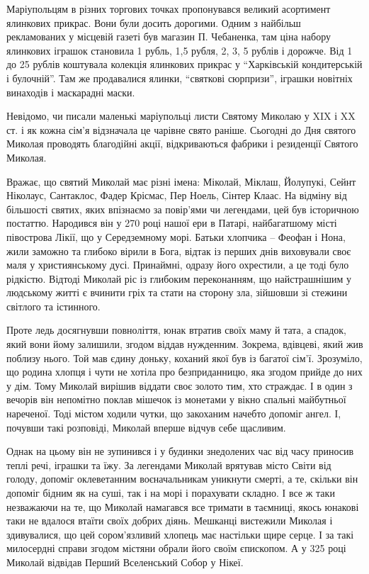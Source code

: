 Маріупольцям в різних торгових точках пропонувався великий асортимент ялинкових
прикрас. Вони були досить дорогими. Одним з найбільш рекламованих у місцевій
газеті був магазин П. Чебаненка, там ціна набору ялинкових іграшок становила 1
рубль, 1,5 рубля, 2, 3, 5 рублів і дорожче. Від 1 до 25 рублів коштувала
колекція ялинкових прикрас у \enquote{Харківській кондитерській і булочній}. Там же
продавалися ялинки, \enquote{святкові сюрпризи}, іграшки новітніх винаходів і
маскарадні маски.

Невідомо, чи писали маленькі маріупольці листи Святому Миколаю у XIX і XX ст. і
як кожна сім’я відзначала це чарівне свято раніше. Сьогодні до Дня святого
Миколая проводять благодійні акції, відкриваються фабрики і резиденції Святого
Миколая.

Вражає, що святий Миколай має різні імена: Міколай, Міклаш, Йолупукі, Сейнт
Ніколаус, Сантаклос, Фадер Крісмас, Пер Ноель, Сінтер Клаас. На відміну від
більшості святих, яких впізнаємо за повір’ями чи легендами, цей був історичною
постаттю. Народився він у 270 році нашої ери в Патарі, найбагатшому місті
півострова Лікії, що у Середземному морі. Батьки хлопчика – Феофан і Нона, жили
заможно та глибоко вірили в Бога, відтак із перших днів виховували своє маля у
християнському дусі. Принаймні, одразу його охрестили, а це тоді було рідкістю.
Відтоді Миколай ріс із глибоким переконанням, що найстрашнішим у людському
житті є вчинити гріх та стати на сторону зла, зійшовши зі стежини світлого та
істинного.

Проте ледь досягнувши повноліття, юнак втратив своїх маму й тата, а спадок,
який вони йому залишили, згодом віддав нужденним. Зокрема, вдівцеві, який жив
поблизу нього. Той мав єдину доньку, коханий якої був із багатої сім’ї.
Зрозуміло, що родина хлопця і чути не хотіла про безприданницю, яка згодом
прийде до них у дім. Тому Миколай вирішив віддати своє золото тим, хто
страждає. І в один з вечорів він непомітно поклав мішечок із монетами у вікно
спальні майбутньої нареченої. Тоді містом ходили чутки, що закоханим начебто
допоміг ангел. І, почувши такі розповіді, Миколай вперше відчув себе щасливим.

Однак на цьому він не зупинився і у будинки знедолених час від часу приносив
теплі речі, іграшки та їжу. За легендами Миколай врятував місто Світи від
голоду, допоміг оклеветанним воєначальникам уникнути смерті, а те, скільки він
допоміг бідним як на суші, так і на морі і порахувати складно.  І все ж таки
незважаючи на те, що Миколай намагався все тримати в таємниці, якось юнакові
таки не вдалося втаїти своїх добрих діянь. Мешканці вистежили Миколая і
здивувалися, що цей сором'язливий хлопець має настільки щире серце. І за такі
милосердні справи згодом містяни обрали його своїм єпископом. А у 325 році
Миколай відвідав Перший Вселенський Собор у Нікеї.

